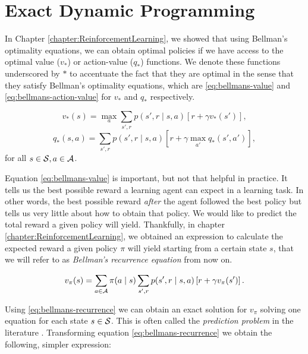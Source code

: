 \section{Exact Dynamic Programming}
In Chapter \ref{chapter:ReinforcementLearning}, we showed that using Bellman's
optimality equations, we can obtain optimal policies if we have access to the
optimal value ($v_*$) or action-value ($q_{*}$) functions. We denote these
functions underscored by $*$ to accentuate the fact that they are optimal in the
sense that they satisfy Bellman's optimality equations, which are
\eqref{eq:bellmans-value} and \eqref{eq:bellmans-action-value} for $v_*$ and
$q_*$ respectively. 


\begin{equation}
\label{eq:bellmans-value}
v_{*}(s) = \max_{a} \sum_{s', r} p(s', r \mid s, a) \left[ r + \gamma v_{*} (s')
\right],
\end{equation}
\begin{equation}
\label{eq:bellmans-action-value}
q_{*}(s, a) = \sum_{s', r} p(s', r \mid s, a) \left[ r + \gamma \max_{a'} q_{*}
(s', a') \right],
\end{equation}
for all $s \in \mathcal{S}, a \in \mathcal{A}$.

Equation \eqref{eq:bellmans-value} is important, but not that helpful in
practice. It tells us the best possible reward a learning agent can expect in a
learning task. In other words, the best possible reward \textit{after} the agent
followed the best policy but tells us very little about how to obtain that
policy. We would like to predict the total reward a given policy will yield.
Thankfully, in chapter \ref{chapter:ReinforcementLearning}, we obtained an
expression to calculate the expected reward a given policy $\pi$ will yield
starting from a certain state $s$, that we will refer to as \textit{Bellman's
recurrence equation} from now on. 

\begin{equation}
\label{eq:bellmans-recurrence}
v_\pi (s) = \sum_{a \in \mathcal{A}} \pi(a \mid s) \sum_{s', r} p(s', r \mid s, a) \left[ r + \gamma v_{\pi}(s') \right].
\end{equation}

Using \eqref{eq:bellmans-recurrence} we can obtain an exact solution for $v_\pi$
solving one equation for each state $s \in \mathcal{S}$. This is often called the
\textit{prediction problem} in the literature \cite[Chapter~4.1]{SuttonBarto}.
Transforming equation \eqref{eq:bellmans-recurrence} we obtain the following,
simpler expression:


